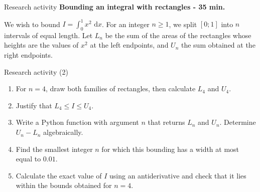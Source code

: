 \documentclass[aspectratio=169,10pt]{beamer}
\providecommand{\dd}{\,\mathrm{d}}
\begin{document}
\begin{frame}{Research activity}
\textbf{Bounding an integral with rectangles - 35 min.}

We wish to bound \(I=\displaystyle\int_0^1x^2\,\dd x\). For an integer \(n\ge1\), we split \([0;1]\) into \(n\) intervals of equal length. Let \(L_n\) be the sum of the areas of the rectangles whose heights are the values of \(x^2\) at the left endpoints, and \(U_n\) the sum obtained at the right endpoints.
\end{frame}
\begin{frame}{Research activity (2)}
\begin{enumerate}
\setcounter{enumi}{0}\item For \(n=4\), draw both families of rectangles, then calculate \(L_4\) and \(U_4\).

\item Justify that \(L_4\le I\le U_4\).

\item Write a Python function with argument \(n\) that returns \(L_n\) and \(U_n\). Determine \(U_n-L_n\) algebraically.

\item Find the smallest integer \(n\) for which this bounding has a width at most equal to \(0.01\).

\item Calculate the exact value of \(I\) using an antiderivative and check that it lies within the bounds obtained for \(n=4\).

\end{enumerate}
\end{frame}
\end{document}
